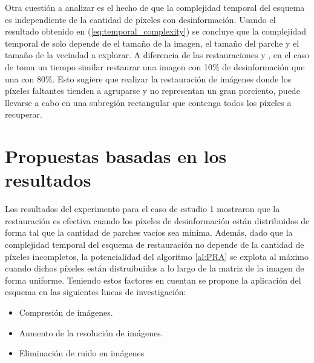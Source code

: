 Otra cuesti\'on a analizar es el hecho de que la complejidad temporal del esquema \SOP es independiente de la cantidad de p\'ixeles con desinformaci\'on. Usando el resultado obtenido en (\ref{eq:temporal_complexity}) se concluye que la complejidad temporal de \SOP solo depende de el tamaño de la imagen, el tamaño del parche y el tamaño de la vecindad a explorar. A diferencia de las restauraciones \TELEA y \NS, en el caso de \SOP toma un tiempo similar restaurar una imagen con 10\% de desinformaci\'on que una con 80\%. Esto sugiere que realizar la restauraci\'on de im\'agenes donde los p\'ixeles faltantes tienden a agruparse y no representan un gran porciento, puede llevarse a cabo en una subregi\'on rectangular que contenga todos los p\'ixeles a recuperar.

\section{Propuestas basadas en los resultados}\label{sec:suggestions}

Los resultados del experimento para el caso de estudio 1 mostraron que la restauraci\'on \SOP es efectiva cuando los p\'ixeles de desinformaci\'on est\'an distribuidos de forma tal que la cantidad de parches vac\'ios sea m\'inima. Adem\'as, dado que la complejidad temporal del esquema de restauraci\'on no depende de la cantidad de p\'ixeles incompletos, la potencialidad del algoritmo \ref{al:PRA} se explota al m\'aximo cuando dichos p\'ixeles están distruibuidos a lo largo de la matriz de la imagen de forma uniforme. Teniendo estos factores en cuentan se propone la aplicaci\'on del esquema \SOP en las siguientes lineas de investigaci\'on:
\begin{itemize}
	\item Compresi\'on de im\'agenes.
	\item Aumento de la resoluci\'on de im\'agenes.
	\item Eliminaci\'on de ruido en im\'agenes 
\end{itemize}

